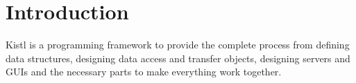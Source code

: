 \chapter{Introduction}

Kistl is a programming framework to provide the complete process from
defining data structures, designing data access and transfer objects,
designing servers and GUIs and the necessary parts to make everything
work together.

